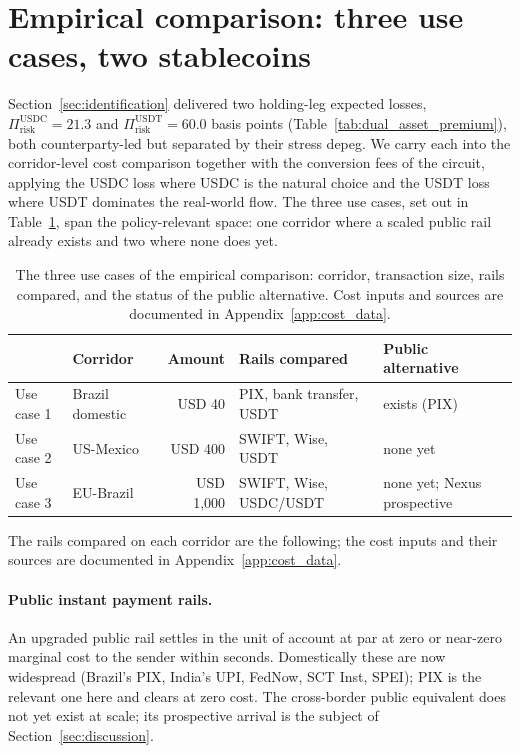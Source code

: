 \section{Empirical comparison: three use cases, two stablecoins}\label{sec:empirical_comparison}

Section~\ref{sec:identification} delivered two holding-leg expected losses, $\Pi_{\text{risk}}^{\text{USDC}} = 21.3$ and $\Pi_{\text{risk}}^{\text{USDT}} = 60.0$ basis points (Table~\ref{tab:dual_asset_premium}), both counterparty-led but separated by their stress depeg. We carry each into the corridor-level cost comparison together with the conversion fees of the circuit, applying the USDC loss where USDC is the natural choice and the USDT loss where USDT dominates the real-world flow. The three use cases, set out in Table~\ref{tab:use_cases}, span the policy-relevant space: one corridor where a scaled public rail already exists and two where none does yet.

\begin{table}[H]
\centering
\caption{The three use cases of the empirical comparison: corridor, transaction size, rails compared, and the status of the public alternative. Cost inputs and sources are documented in Appendix~\ref{app:cost_data}.}\label{tab:use_cases}
\begin{tabularx}{\textwidth}{llr>{\raggedright\arraybackslash}X>{\raggedright\arraybackslash}X}
\toprule
 & Corridor & Amount & Rails compared & Public alternative \\
\midrule
Use case 1 & Brazil domestic & USD 40      & PIX, bank transfer, USDT & exists (PIX) \\
Use case 2 & US-Mexico       & USD 400     & SWIFT, Wise, USDT        & none yet \\
Use case 3 & EU-Brazil       & USD 1{,}000 & SWIFT, Wise, USDC/USDT   & none yet; Nexus prospective \\
\bottomrule
\end{tabularx}
\end{table}

The rails compared on each corridor are the following; the cost inputs and their sources are documented in Appendix~\ref{app:cost_data}.

\paragraph{Public instant payment rails.} An upgraded public rail settles in the unit of account at par at zero or near-zero marginal cost to the sender within seconds. Domestically these are now widespread (Brazil's PIX, India's UPI, FedNow, SCT Inst, SPEI); PIX is the relevant one here and clears at zero cost. The cross-border public equivalent does not yet exist at scale; its prospective arrival is the subject of Section~\ref{sec:discussion}.


